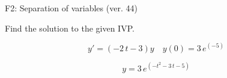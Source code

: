 \begin{exercise}
  \begin{exerciseTitle}F2: Separation of variables (ver. 44)\end{exerciseTitle}
  \begin{exerciseStatement}
    
Find the solution to the given IVP.

    
\[y'=( -2 \, t - 3 )y\hspace{1em} y(0)= 3 \, e^{\left(-5\right)}\]

  \end{exerciseStatement}
  \begin{exerciseAnswer}
    
\[y= 3 \, e^{\left(-t^{2} - 3 \, t - 5\right)}\]

  \end{exerciseAnswer}
\end{exercise}